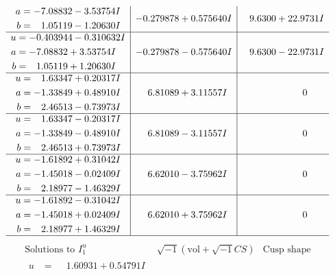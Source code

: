 \documentclass[1p]{elsarticle_modified}
\theoremstyle{definition}
\newcommand{\I}{\sqrt{-1}}
\begin{document}
$$\begin{array}{c|c|c}
\begin{aligned}
a &= -7.08832 - 3.53754 I \\
b &= \phantom{-}1.05119 - 1.20630 I\end{aligned}
 & -0.279878 + 0.575640 I & \phantom{-}9.6300 + 22.9731 I \\ \hline\begin{aligned}
u &= -0.403944 - 0.310632 I \\
a &= -7.08832 + 3.53754 I \\
b &= \phantom{-}1.05119 + 1.20630 I\end{aligned}
 & -0.279878 - 0.575640 I & \phantom{-}9.6300 - 22.9731 I \\ \hline\begin{aligned}
u &= \phantom{-}1.63347 + 0.20317 I \\
a &= -1.33849 + 0.48910 I \\
b &= \phantom{-}2.46513 - 0.73973 I\end{aligned}
 & \phantom{-}6.81089 + 3.11557 I & \phantom{-0.000000 } 0 \\ \hline\begin{aligned}
u &= \phantom{-}1.63347 - 0.20317 I \\
a &= -1.33849 - 0.48910 I \\
b &= \phantom{-}2.46513 + 0.73973 I\end{aligned}
 & \phantom{-}6.81089 - 3.11557 I & \phantom{-0.000000 } 0 \\ \hline\begin{aligned}
u &= -1.61892 + 0.31042 I \\
a &= -1.45018 - 0.02409 I \\
b &= \phantom{-}2.18977 - 1.46329 I\end{aligned}
 & \phantom{-}6.62010 - 3.75962 I & \phantom{-0.000000 } 0 \\ \hline\begin{aligned}
u &= -1.61892 - 0.31042 I \\
a &= -1.45018 + 0.02409 I \\
b &= \phantom{-}2.18977 + 1.46329 I\end{aligned}
 & \phantom{-}6.62010 + 3.75962 I & \phantom{-0.000000 } 0\\
 \hline 
 \end{array}$$\newpage$$\begin{array}{c|c|c}  
\text{Solutions to }I^u_{1}& \I (\text{vol} + \sqrt{-1}CS) & \text{Cusp shape}\\
 \hline 
\begin{aligned}
u &= \phantom{-}1.60931 + 0.54791 I \\

\end{aligned}
\end{array}$$
\end{document}
